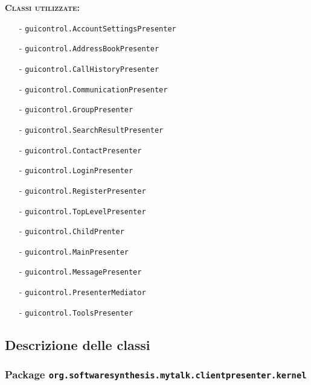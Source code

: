 \begin{description}
	\item{\scshape\bfseries Classi utilizzate:}\\
	\begin{itemize}[noitemsep,nolistsep]
	  \item[-] \texttt{guicontrol.AccountSettingsPresenter}
	  \item[-] \texttt{guicontrol.AddressBookPresenter}
	  \item[-] \texttt{guicontrol.CallHistoryPresenter}
	  \item[-] \texttt{guicontrol.CommunicationPresenter}
	  \item[-] \texttt{guicontrol.GroupPresenter}	 
	  \item[-] \texttt{guicontrol.SearchResultPresenter}	   
	  \item[-] \texttt{guicontrol.ContactPresenter}
	  \item[-] \texttt{guicontrol.LoginPresenter}
	  \item[-] \texttt{guicontrol.RegisterPresenter}	 
	  \item[-] \texttt{guicontrol.TopLevelPresenter}	  
	  \item[-] \texttt{guicontrol.ChildPrenter}	  
	  \item[-] \texttt{guicontrol.MainPresenter}
		\item[-] \texttt{guicontrol.MessagePresenter}
		\item[-] \texttt{guicontrol.PresenterMediator}
	  \item[-] \texttt{guicontrol.ToolsPresenter}
	\end{itemize}
\end{description}

\subsection{Descrizione delle classi}

\subsubsection{Package \texttt{org.softwaresynthesis.mytalk.clientpresenter.kernel}}

